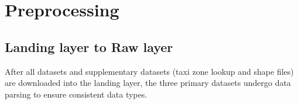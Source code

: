 \documentclass[11pt]{article}
\begin{document}






\section{Preprocessing}
\subsection{Landing layer to Raw layer}
After all datasets and supplementary datasets (taxi zone lookup and shape files) are downloaded into the landing layer, the three primary datasets undergo data parsing to ensure consistent data types.

\end{document}
